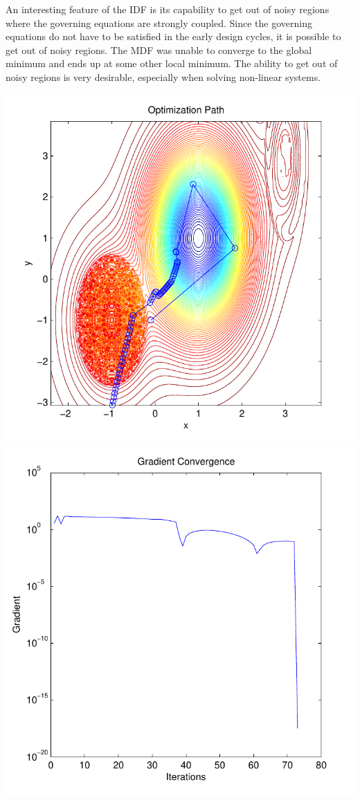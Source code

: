 \documentclass[letterpaper,12pt]{article}
\begin{document}
An interesting feature of the IDF is its capability to get out of noisy regions where the governing equations are strongly coupled. Since the governing equations do not have to be satisfied in the early design cycles, it is possible to get out of noisy regions. The MDF was unable to converge to the global minimum and ends up at some other local minimum. The ability to get out of noisy regions is very desirable, especially when solving non-linear systems.
\begin{center}
\begin{multicols}{2}
\includegraphics[scale=0.6]{noisyPath}
\label{noisyPath}
\columnbreak
\includegraphics[scale=0.6]{noisyGrad}
\label{noisyGrad}
\end{multicols}
\end{center}
\end{document}
